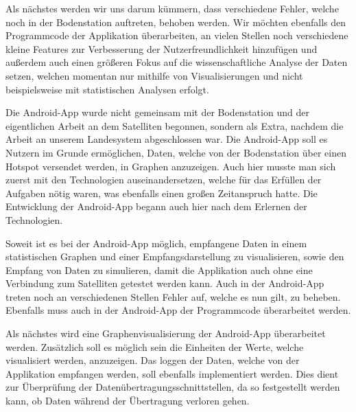 Als nächstes werden wir uns darum kümmern, dass verschiedene Fehler, welche noch in der Bodenstation auftreten, behoben werden. Wir möchten ebenfalls den Programmcode der Applikation überarbeiten, an vielen Stellen noch verschiedene kleine Features zur Verbesserung der Nutzerfreundlichkeit hinzufügen und außerdem auch einen größeren Fokus auf die wissenschaftliche Analyse der Daten setzen, welchen momentan nur mithilfe von Visualisierungen und nicht beispielsweise mit statistischen Analysen erfolgt.

Die Android-App wurde nicht gemeinsam mit der Bodenstation und der eigentlichen Arbeit an dem Satelliten begonnen, sondern als Extra, nachdem die Arbeit an unserem Landesystem abgeschlossen war. Die Android-App soll es Nutzern im Grunde ermöglichen, Daten, welche von der Bodenstation über einen Hotspot versendet werden, in Graphen anzuzeigen. Auch hier musste man sich zuerst mit den Technologien auseinandersetzen, welche für das Erfüllen der Aufgaben nötig waren, was ebenfalls einen großen Zeitanspruch hatte. Die Entwicklung der Android-App begann auch hier nach dem Erlernen der Technologien.

Soweit ist es bei der Android-App möglich, empfangene Daten in einem statistischen Graphen und einer Empfangsdarstellung zu visualisieren, sowie den Empfang von Daten zu simulieren, damit die Applikation auch ohne eine Verbindung zum Satelliten getestet werden kann. Auch in der Android-App treten noch an verschiedenen Stellen Fehler auf, welche es nun gilt, zu beheben. Ebenfalls muss auch in der Android-App der Programmcode überarbeitet werden.

Als nächstes wird eine Graphenvisualisierung der Android-App überarbeitet werden. Zusätzlich soll es möglich sein die Einheiten der Werte, welche visualisiert werden, anzuzeigen. Das loggen der Daten, welche von der Applikation empfangen werden, soll ebenfalls implementiert werden. Dies dient zur Überprüfung der Datenübertragungsschnittstellen, da so festgestellt werden kann, ob Daten während der Übertragung verloren gehen.